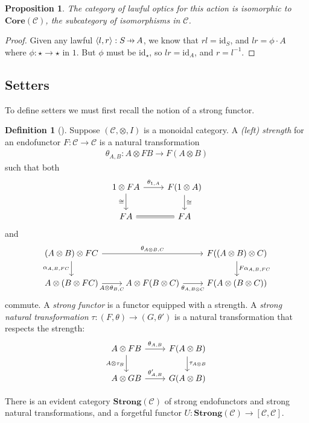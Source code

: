 \documentclass[11pt,a4paper]{article}
\theoremstyle{plain}
\newtheorem{proposition}[theorem]{Proposition}
\theoremstyle{definition}
\newtheorem{definition}[theorem]{Definition}
\newcommand{\C}{\mathscr{C}}
\newcommand{\Core}{\mathbf{Core}}
\newcommand{\Strong}{\mathbf{Strong}}
\newcommand{\id}{\mathrm{id}}
\newcommand{\hto}{\ensuremath{\,\mathaccent\shortmid\rightarrow\,}}
\newcommand{\todo}[1]{\textcolor{red}{\small #1}}
\begin{document}
\begin{proposition}
The category of \emph{lawful} optics for this action is isomorphic to $\Core(\C)$, the subcategory of isomorphisms in $\C$.
\end{proposition}
\begin{proof}
Given any lawful $\langle l, r \rangle : S \hto A$, we know that $rl = \id_S$, and $lr = \phi \cdot A$ where $\phi : \star \to \star$ in $1$. But $\phi$ must be $\id_\star$, so $lr = \id_A$, and $r = l^{-1}$.
\end{proof}

\subsection{Setters}

To define setters we must first recall the notion of a strong functor.

\begin{definition}[\cite{StrongFunctors}]
Suppose $(\C, \otimes, I)$ is a monoidal category. A \emph{(left) strength} for an endofunctor $F : \C \to \C$ is a natural transformation
\begin{align*}
\theta_{A,B} : A \otimes F B \to F(A \otimes B)
\end{align*}
such that both
\[
\begin{tikzcd}
1 \otimes F A \ar[r, "\theta_{1,A}"] \ar[d, "\cong" left]  & F(1 \otimes A) \ar[d, "\cong" right] \\
F A \ar[r, equals] & F A
\end{tikzcd}
\]
and
\[
\begin{tikzcd}
(A \otimes B) \otimes F C \ar[rr, "\theta_{A \otimes B, C}"] \ar[d, "\alpha_{A,B,FC}" left]  && F((A \otimes B) \otimes C) \ar[d, "F\alpha_{A,B,FC}" right] \\
A \otimes (B \otimes F C) \ar[r, "A \otimes \theta_{B,C}" below] & A \otimes F(B \otimes C) \ar[r, "\theta_{A, B\otimes C}" below] & F(A \otimes (B \otimes C))
\end{tikzcd}
\]
commute. A \emph{strong functor} is a functor equipped with a strength. A \emph{strong natural transformation} $\tau : (F,\theta) \to (G,\theta')$ is a natural transformation that respects the strength:
\[
\begin{tikzcd}
A \otimes F B \ar[r, "\theta_{A,B}"] \ar[d, "A \otimes \tau_B" left]  & F(A \otimes B) \ar[d, "\tau_{A \otimes B}" right] \\
A \otimes G B \ar[r, "\theta'_{A, B}"]& G(A \otimes B)
\end{tikzcd}
\]

There is an evident category $\Strong(\C)$ of strong endofunctors and strong natural transformations, and a forgetful functor $U : \Strong(\C) \to [\C, \C]$.
\end{definition}
\end{document}

